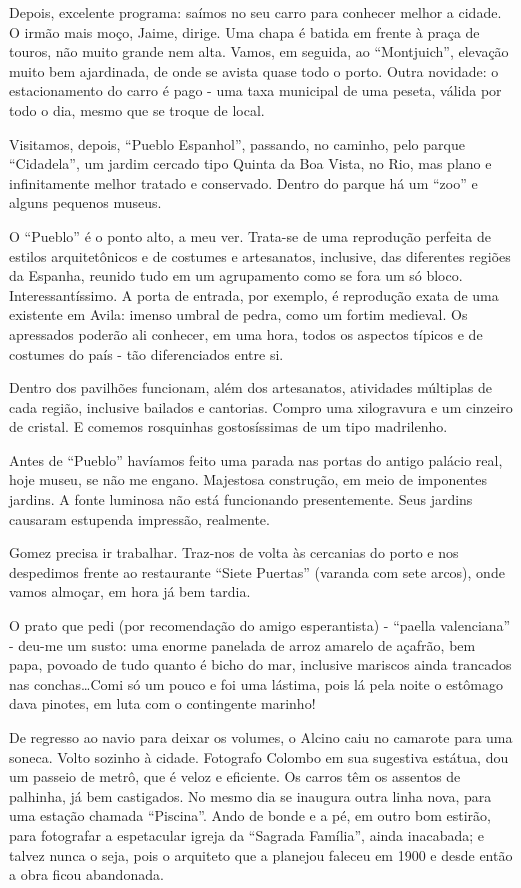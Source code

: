 Depois, excelente programa: saímos no seu carro para conhecer melhor a cidade. O irmão mais moço, Jaime, dirige. Uma chapa é batida em frente à praça de touros, não muito grande nem alta. Vamos, em seguida, ao “Montjuich”, elevação muito bem ajardinada, de onde se avista quase todo o porto. Outra novidade: o estacionamento do carro é pago - uma taxa municipal de uma peseta, válida por todo o dia, mesmo que se troque de local.

Visitamos, depois, “Pueblo Espanhol”, passando, no caminho, pelo parque “Cidadela”, um jardim cercado tipo Quinta da Boa Vista, no Rio, mas plano e infinitamente melhor tratado e conservado. Dentro do parque há um “zoo” e alguns pequenos museus.

O “Pueblo” é o ponto alto, a meu ver. Trata-se de uma reprodução perfeita de estilos arquitetônicos e de costumes e artesanatos, inclusive, das diferentes regiões da Espanha, reunido tudo em um agrupamento como se fora um só bloco. Interessantíssimo. A porta de entrada, por exemplo, é reprodução exata de uma existente em Avila: imenso umbral de pedra, como um fortim medieval. Os apressados poderão ali conhecer, em uma hora, todos os aspectos típicos e de costumes do país - tão diferenciados entre si.

Dentro dos pavilhões funcionam, além dos artesanatos, atividades múltiplas de cada região, inclusive bailados e cantorias. Compro uma xilogravura e um cinzeiro de cristal. E comemos rosquinhas gostosíssimas de um tipo madrilenho.

Antes de “Pueblo” havíamos feito uma parada nas portas do antigo palácio real, hoje museu, se não me engano. Majestosa construção, em meio de imponentes jardins. A fonte luminosa não está funcionando presentemente. Seus jardins causaram estupenda impressão, realmente.

Gomez precisa ir trabalhar. Traz-nos de volta às cercanias do porto e nos despedimos frente ao restaurante “Siete Puertas” (varanda com sete arcos), onde vamos almoçar, em hora já bem tardia.

O prato que pedi (por recomendação do amigo esperantista) - “paella valenciana” - deu-me um susto: uma enorme panelada de arroz amarelo de açafrão, bem papa, povoado de tudo quanto é bicho do mar, inclusive mariscos ainda trancados nas conchas\ldots Comi só um pouco e foi uma lástima, pois lá pela noite o estômago dava pinotes, em luta com o contingente marinho!

De regresso ao navio para deixar os volumes, o Alcino caiu no camarote para uma soneca. Volto sozinho à cidade. Fotografo Colombo em sua sugestiva estátua, dou um passeio de metrô, que é veloz e eficiente. Os carros têm os assentos de palhinha, já bem castigados. No mesmo dia se inaugura outra linha nova, para uma estação chamada “Piscina”. Ando de bonde e a pé, em outro bom estirão, para fotografar a espetacular igreja da “Sagrada Família”, ainda inacabada; e talvez nunca o seja, pois o arquiteto que a planejou faleceu em 1900 e desde então a obra ficou abandonada.


